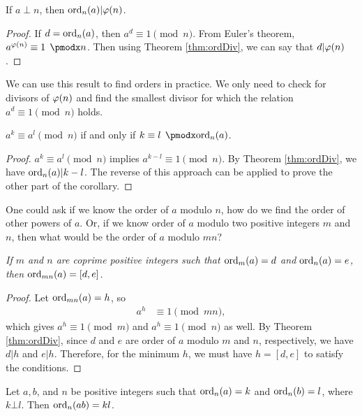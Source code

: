 \documentclass{subfile}
\begin{document}
	\begin{corollary}\label{cor:phiDiv}
		If $a\perp n$, then $\operatorname{ord}_n(a)|\varphi (n)$.
	\end{corollary}
	
	\begin{proof}
		If $d=\operatorname{ord}_n(a)$, then $a^d\equiv1\pmod n$. From Euler's theorem, $a^{\t (n)}\equiv1\pmod n$. Then using Theorem \ref{thm:ordDiv}, we can say that $d|\varphi (n)$.
	\end{proof}
We can use this result to find orders in practice. We only need to check for divisors of $\varphi(n)$ and find the smallest divisor for which the relation $a^d\equiv1\pmod n$ holds.
	\begin{corollary}
		$a^k\equiv a^l\pmod n$ if and only if $k\equiv l\pmod{\ord_n(a)}$.
	\end{corollary}
	
	\begin{proof}
		$a^k\equiv a^l\pmod n$ implies $a^{k-l} \equiv 1 \pmod n$. By Theorem \ref{thm:ordDiv}, we have $\operatorname{ord}_n(a) | k-l$. The reverse of this approach can be applied to prove the other part of the corollary.
	\end{proof}
One could ask if we know the order of $a$ modulo $n$, how do we find the order of other powers of $a$. Or, if we know order of $a$ modulo two positive integers $m$ and $n$, then what would be the order of $a$ modulo $mn$?
	\begin{theorem}\slshape
		If $m$ and $n$ are coprime positive integers such that $\operatorname{ord}_m(a)=d$ and $\operatorname{ord}_n(a)=e$, then $\operatorname{ord}_{mn}(a)=[d,e]$.\label{thm:ordL}
	\end{theorem}
	
	\begin{proof}
		Let $\operatorname{ord}_{mn}(a)=h$, so
			\begin{align*}
				a^h & \equiv1\pmod {mn},
			\end{align*} 
		which gives $a^h\equiv1\pmod m$ and $a^h\equiv1\pmod n$ as well. By Theorem \ref{thm:ordDiv}, since $d$ and $e$ are order of $a$ modulo $m$ and $n$, respectively, we have $d|h$ and $e|h$. Therefore, for the minimum $h$, we must have $h=[d,e]$ to satisfy the conditions.
	\end{proof}
	
	\begin{theorem}\label{thm:prproduct}
		Let $a,b$, and $n$ be positive integers such that $\operatorname{ord}_n(a)=k$ and $\operatorname{ord}_n(b)=l$, where $k\bot l$. Then $\operatorname{ord}_n(ab)=kl$.
	\end{theorem}
	
\end{document}
